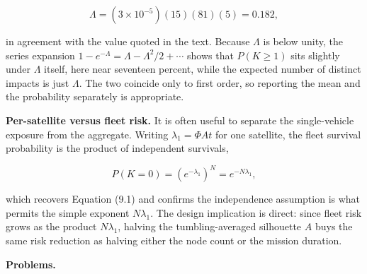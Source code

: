 \documentclass[
  11pt,
  openany,
  oneside]{book}
\begin{document}
\begin{equation}
\Lambda = (3\times10^{-5})(15)(81)(5) = 0.182, \tag{9.4}
\end{equation}

in agreement with the value quoted in the text. Because \(\Lambda\) is
below unity, the series expansion
\(1 - e^{-\Lambda} = \Lambda - \Lambda^2/2 + \cdots\) shows that
\(P(K\ge 1)\) sits slightly under \(\Lambda\) itself, here near
seventeen percent, while the expected number of distinct impacts is just
\(\Lambda\). The two coincide only to first order, so reporting the mean
and the probability separately is appropriate.

\textbf{Per-satellite versus fleet risk.} It is often useful to separate
the single-vehicle exposure from the aggregate. Writing
\(\lambda_1 = \Phi A t\) for one satellite, the fleet survival
probability is the product of independent survivals,

\begin{equation}
P(K = 0) = \left(e^{-\lambda_1}\right)^{N} = e^{-N\lambda_1}, \tag{9.5}
\end{equation}

which recovers Equation (9.1) and confirms the independence assumption
is what permits the simple exponent \(N\lambda_1\). The design
implication is direct: since fleet risk grows as the product
\(N\lambda_1\), halving the tumbling-averaged silhouette \(A\) buys the
same risk reduction as halving either the node count or the mission
duration.

\textbf{Problems.}
\end{document}
